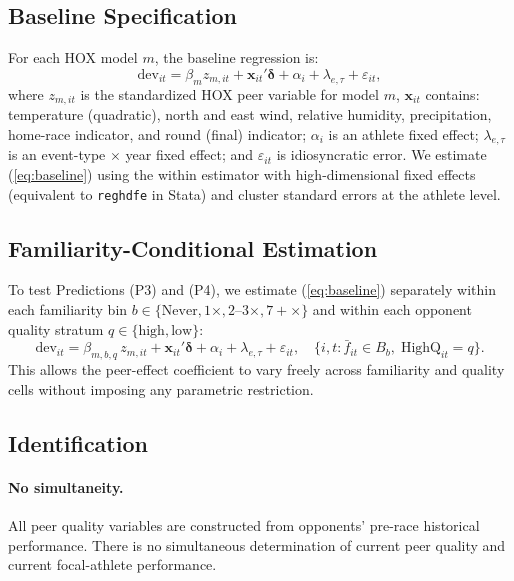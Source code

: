 \documentclass[12pt]{article}
\theoremstyle{definition}
\theoremstyle{remark}
\begin{document}
\subsection{Baseline Specification}

For each HOX model $m$, the baseline regression is:
\begin{equation}
\text{dev}_{it} = \beta_m z_{m,it} + \mathbf{x}_{it}'\boldsymbol{\delta}
+ \alpha_i + \lambda_{e,\tau} + \varepsilon_{it},
\label{eq:baseline}
\end{equation}
where $z_{m,it}$ is the standardized HOX peer variable for model $m$,
$\mathbf{x}_{it}$ contains: temperature (quadratic), north and east wind,
relative humidity, precipitation, home-race indicator, and round (final) indicator;
$\alpha_i$ is an athlete fixed effect; $\lambda_{e,\tau}$ is an
event-type $\times$ year fixed effect; and $\varepsilon_{it}$ is idiosyncratic error.
We estimate (\ref{eq:baseline}) using the within estimator with high-dimensional
fixed effects (equivalent to \texttt{reghdfe} in Stata) and cluster standard errors
at the athlete level.

\subsection{Familiarity-Conditional Estimation}

To test Predictions (P3) and (P4), we estimate (\ref{eq:baseline}) separately
within each familiarity bin $b \in \{\text{Never}, 1\times, 2\text{--}3\times, 7+\times\}$
and within each opponent quality stratum $q \in \{\text{high}, \text{low}\}$:
\begin{equation}
\text{dev}_{it} = \beta_{m,b,q}\,z_{m,it} + \mathbf{x}_{it}'\boldsymbol{\delta}
+ \alpha_i + \lambda_{e,\tau} + \varepsilon_{it},
\quad \{i,t: \bar{f}_{it}\in B_b,\;\text{HighQ}_{it}=q\}.
\label{eq:quality_fam}
\end{equation}
This allows the peer-effect coefficient to vary freely across familiarity
and quality cells without imposing any parametric restriction.

\subsection{Identification}

\paragraph{No simultaneity.}
All peer quality variables are constructed from opponents' pre-race historical
performance. There is no simultaneous determination of current peer quality
and current focal-athlete performance.
\end{document}
